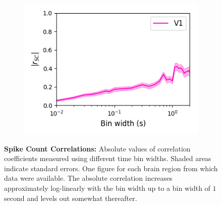 \documentclass[a4paper,12pt]{article}
\theoremstyle{definition}
\begin{document}
\begin{figure}[p]
\begin{subfigure}{0.5\textwidth}
    \includegraphics[width=\textwidth]{figures/bin_width_correlations_v1_6.png}
  \end{subfigure}
  \caption{\textbf{Spike Count Correlations:} Absolute values of correlation coefficients measured using different time bin widths. Shaded areas indicate standard errors. One figure for each brain region from which data were available. The absolute correlation increases approximately log-linearly with the bin width up to a bin width of $1$ second and levels out somewhat thereafter.}
  \label{fig:bin_width_vs_correlation_by_region}
\end{figure}
\end{document}
